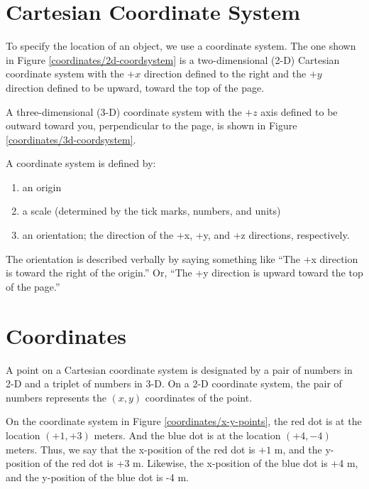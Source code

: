 
\section*{Cartesian Coordinate System}

To specify the location of an object, we use a coordinate system. The one shown in Figure \ref{coordinates/2d-coordsystem} is a two-dimensional (2-D) Cartesian coordinate system with the $+x$ direction defined to the right and the $+y$ direction defined to be upward, toward the top of the page.


A three-dimensional (3-D) coordinate system with the $+z$ axis defined to be outward toward you, perpendicular to the page, is shown in Figure \ref{coordinates/3d-coordsystem}.


A coordinate system is defined by:

\begin{enumerate}
	\item an origin
	\item a scale (determined by the tick marks, numbers, and units)
	\item an orientation; the direction of the +x, +y, and +z directions, respectively. 
\end{enumerate}

The orientation is described verbally by saying something like ``The +x direction is toward the right of the origin.'' Or, ``The +y direction is upward toward the top of the page.''

\section*{Coordinates}

A point on a Cartesian coordinate system is designated by a pair of numbers in 2-D and a triplet of numbers in 3-D. On a 2-D coordinate system, the pair of numbers represents the $(x,y)$ coordinates of the point.

On the coordinate system in Figure \ref{coordinates/x-y-points}, the red dot is at the location $(+1,+3)$ meters. And the blue dot is at the location $(+4,-4)$ meters. Thus, we say that the x-position of the red dot is $+1$ m, and the y-position of the red dot is +3 m. Likewise, the x-position of the blue dot is +4 m, and the y-position of the blue dot is -4 m.

